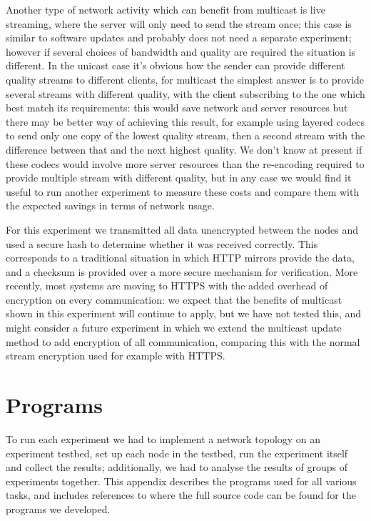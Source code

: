 \documentclass[a4paper,12pt]{article}
\begin{document}
Another type of network activity which can benefit from multicast is
live streaming, where the server will only need to send the stream once;
this case is similar to software updates and probably does not need a
separate experiment; however if several choices of bandwidth and quality
are required the situation is different.  In the unicast case it's obvious
how the sender can provide different quality streams to different clients,
for multicast the simplest answer is to provide several streams with
different quality, with the client subscribing to the one which best
match its requirements: this would save network and server resources
but there may be better way of achieving this result, for example using
layered codecs to send only one copy of the lowest quality stream, then
a second stream with the difference between that and the next highest
quality. We don't know at present if these codecs would involve more
server resources than the re-encoding required to provide multiple
stream with different quality, but in any case we would find it useful
to run another experiment to measure these costs and compare them with
the expected savings in terms of network usage.

For this experiment we transmitted all data unencrypted between the nodes
and used a secure hash to determine whether it was received correctly.
This corresponds to a traditional situation in which HTTP mirrors provide
the data, and a checksum is provided over a more secure mechanism for
verification.  More recently, most systems are moving to HTTPS with the
added overhead of encryption on every communication: we expect that the
benefits of multicast shown in this experiment will continue to apply,
but we have not tested this, and might consider a future experiment in
which we extend the multicast update method to add encryption of all
communication, comparing this with the normal stream encryption used
for example with HTTPS.

\appendix
\section{Programs}
\label{programs}

To run each experiment we had to implement a network topology on an
experiment testbed, set up each node in the testbed, run the experiment
itself and collect the results; additionally, we had to analyse the
results of groups of experiments together.  This appendix describes
the programs used for all various tasks, and includes references to
where the full source code can be found for the programs we developed.
\end{document}
